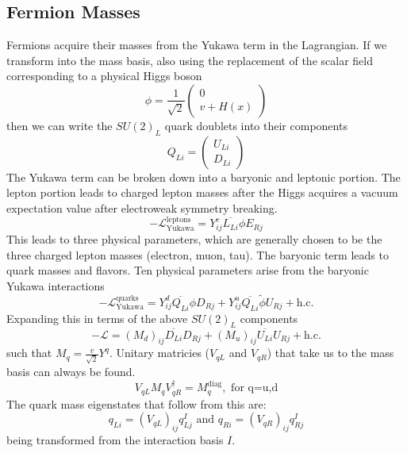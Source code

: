 \subsection{Fermion Masses}
Fermions acquire their masses from the Yukawa term in the Lagrangian.  If we transform into the mass basis, also using the replacement of the scalar field corresponding to a physical Higgs boson
\[ \phi=\frac{1}{\sqrt{2}}\begin{pmatrix}0\\v+H(x)\end{pmatrix} \]
then we can write the $SU(2)_L$ quark doublets into their components \[Q_{Li}=\begin{pmatrix}U_{Li}\\D_{Li}\end{pmatrix}\]
The Yukawa term can be broken down into a baryonic and leptonic portion.  The lepton portion leads to charged lepton masses after the Higgs acquires a vacuum expectation value after electroweak symmetry breaking.
\[ -\mathcal{L}^\text{leptons}_\text{Yukawa} = Y_{ij}^e \overline{L_{Li}}\phi E_{Rj} \]
This leads to three physical parameters, which are generally chosen to be the three charged lepton masses (electron, muon, tau).  The baryonic term leads to quark masses and flavors. Ten physical parameters arise from the baryonic Yukawa interactions  
\[ -\mathcal{L}^{\text{quarks}}_\text{Yukawa} = Y_{ij}^d \overline{Q_{Li}} \phi D_{Rj} + Y_{ij}^u \overline{Q_{Li}} \tilde{\phi}U_{Rj} + \text{h.c.}\]
Expanding this in terms of the above $SU(2)_L$ components
\[-\mathcal{L}=(M_d)_{ij}\overline{D_{Li}} D_{Rj} +(M_u)_{ij}\overline{U_{Li}}U_{Rj} +\text{h.c.} \]
such that $M_q = \frac{v}{\sqrt{2}}Y^q$.  Unitary matricies ($V_{qL}$ and $V_{qR}$) that take us to the mass basis can always be found. 
\[V_{qL} M_q V_{qR}^{\dagger} =M_q^\text{diag}, \text{  for q=u,d} \]
The quark mass eigenstates that follow from this are: \[q_{Li}=(V_{qL})_{ij}q_{Lj}^I \text{  and  } q_{Ri} = (V_{qR})_{ij}q_{Rj}^I \] being transformed from the interaction basis $I$.

